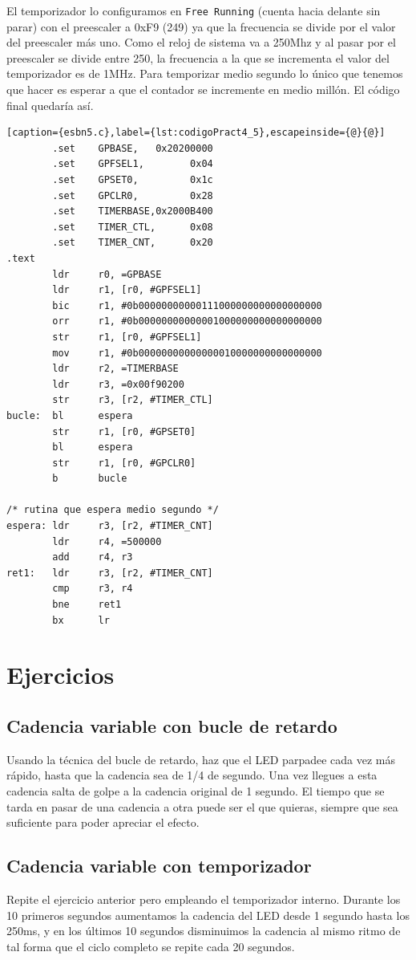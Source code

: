 El temporizador lo configuramos en {\tt Free Running} (cuenta hacia delante sin parar) con el
preescaler a 0xF9 (249) ya que la frecuencia se divide por el valor del preescaler más uno. Como
el reloj de sistema va a 250Mhz y al pasar por el preescaler se divide entre 250, la frecuencia
a la que se incrementa el valor del temporizador es de 1MHz. Para temporizar medio segundo lo
único que tenemos que hacer es esperar a que el contador se incremente en medio millón. El código
final quedaría así.

\begin{lstlisting}[caption={esbn5.c},label={lst:codigoPract4_5},escapeinside={@}{@}]
        .set    GPBASE,   0x20200000
        .set    GPFSEL1,        0x04
        .set    GPSET0,         0x1c
        .set    GPCLR0,         0x28
        .set    TIMERBASE,0x2000B400
        .set    TIMER_CTL,      0x08
        .set    TIMER_CNT,      0x20
.text
        ldr     r0, =GPBASE
        ldr     r1, [r0, #GPFSEL1]
        bic     r1, #0b00000000000111000000000000000000
        orr     r1, #0b00000000000001000000000000000000
        str     r1, [r0, #GPFSEL1]
        mov     r1, #0b00000000000000010000000000000000
        ldr     r2, =TIMERBASE
        ldr     r3, =0x00f90200
        str     r3, [r2, #TIMER_CTL]
bucle:  bl      espera
        str     r1, [r0, #GPSET0]
        bl      espera
        str     r1, [r0, #GPCLR0]
        b       bucle

/* rutina que espera medio segundo */
espera: ldr     r3, [r2, #TIMER_CNT]
        ldr     r4, =500000
        add     r4, r3
ret1:   ldr     r3, [r2, #TIMER_CNT]
        cmp     r3, r4
        bne     ret1
        bx      lr
\end{lstlisting}

\section{Ejercicios}

\subsection{Cadencia variable con bucle de retardo}

Usando la técnica del bucle de retardo, haz que el LED parpadee
cada vez más rápido, hasta que la cadencia sea de 1/4 de segundo.
Una vez llegues a esta cadencia salta de golpe a la cadencia
original de 1 segundo. El tiempo que se tarda en pasar de una
cadencia a otra puede ser el que quieras, siempre que sea
suficiente para poder apreciar el efecto.

\subsection{Cadencia variable con temporizador}

Repite el ejercicio anterior pero empleando el temporizador
interno. Durante los 10 primeros segundos aumentamos la cadencia
del LED desde 1 segundo hasta los 250ms, y en los últimos 10
segundos disminuimos la cadencia al mismo ritmo de tal forma
que el ciclo completo se repite cada 20 segundos.

\chapterend{}

